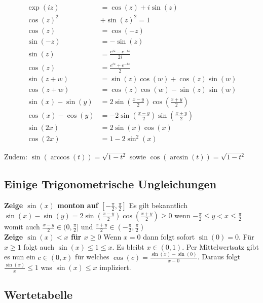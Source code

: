 \documentclass[25pt]{sciposter}
\begin{document}
\begin{multicols}{3}
\begin{align*}
\operatorname{exp}(iz) &= \cos (z) + i\sin(z) \\
\cos(z) ^2 &+ \sin(z)^2 = 1\\
\cos(z) &= \cos(-z)\\
\sin (-z) &= - \sin(z) \\
\sin (z) &= \frac{e^{iz} - e^{-iz}}{2i}\\
\cos (z) &= \frac{e^{iz} + e^{-iz}}{2}\\
\sin(z+w) &= \sin(z) \cos(w) + \cos(z) \sin(w) \\
\cos(z + w) &= \cos(z) \cos(w) - \sin(z) \sin(w)\\
\sin(x) - \sin(y) &=  2 \sin \left(\frac{x-y}{2}\right) \cos \left(\frac{x+y}{2}\right)\\
\cos(x) - \cos(y) &= - 2 \sin \left(\frac{x-y}{2}\right) \sin \left(\frac{x+y}{2}\right)\\
\sin(2x) &= 2\sin(x)\cos(x)\\
\cos(2x) &= 1 - 2\sin^2(x)
\end{align*}

Zudem: $\sin(\arccos(t)) = \sqrt{1 - t^2}$ sowie $\cos(\arcsin(t)) = \sqrt{1-t^2}$


\subsection*{Einige Trigonometrische Ungleichungen}

\textbf{Zeige $\sin(x)$ monton auf $[-\frac{\pi}{2}, \frac{\pi}{2}]$} Es gilt bekanntlich $\sin(x) - \sin(y) =  2 \sin \left(\frac{x-y}{2}\right) \cos \left(\frac{x+y}{2}\right) \geq 0$ wenn $-\frac{\pi}{2} \leq y < x \leq \frac{\pi}{2}$ womit auch $\frac{x-y}{2} \in (0,\frac{\pi}{2}]$ und $\frac{x+y}{2} \in (- \frac{\pi}{2}, \frac{\pi}{2})$\\


\textbf{Zeige $\sin(x) < x$ für $x \geq 0$}
Wenn $x = 0$ dann folgt sofort $\sin(0) = 0$. Für $x\geq 1$ folgt auch $\sin(x) \leq 1 \leq x$. Es bleibt $x \in (0,1)$. Per Mittelwertsatz gibt es nun ein $c \in (0,x)$ für welches $\cos(c) = \frac{\sin(x) - \sin(0)}{x - 0}$. Daraus folgt $\frac{\sin(x)}{x} \leq 1$ was $\sin(x) \leq x$ impliziert.



\subsection*{Wertetabelle}




\end{multicols}
\end{document}
